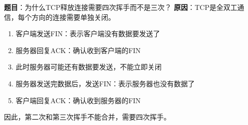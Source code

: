 \begin{examplebox}
\textbf{题目}：为什么TCP释放连接需要四次挥手而不是三次？
\tcblower
\textbf{原因}：TCP是全双工通信，每个方向的连接需要单独关闭。

\begin{enumerate}[itemsep=0pt]
    \item 客户端发送FIN：表示客户端没有数据要发送了
    \item 服务器回复ACK：确认收到客户端的FIN
    \item 此时服务器可能还有数据要发送，不能立即关闭
    \item 服务器发送完数据后，发送FIN：表示服务器也没有数据了
    \item 客户端回复ACK：确认收到服务器的FIN
\end{enumerate}

因此，第二次和第三次挥手不能合并，需要四次挥手。
\end{examplebox}
